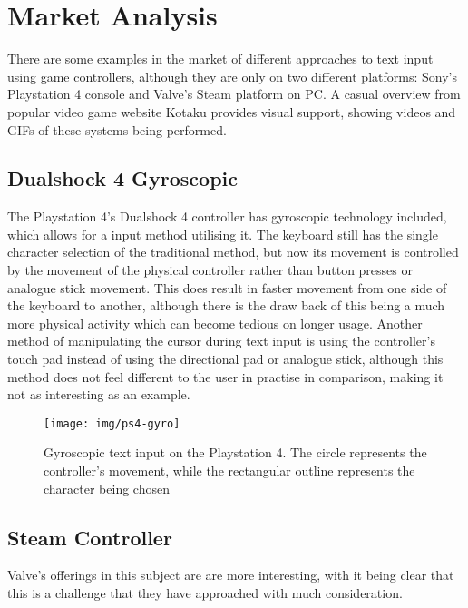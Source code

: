 \documentclass[requirements.tex]{subfiles}
\begin{document}
\section{Market Analysis} %
\label{sec:market_analysis}

There are some examples in the market of different approaches to text input
using game controllers, although they are only on two different platforms:
Sony's Playstation 4 console and Valve's Steam platform on PC. A casual overview
from popular video game website Kotaku \cite{Kotaku} provides visual support,
showing videos and GIFs of these systems being performed.

\subsection{Dualshock 4 Gyroscopic} %
\label{sub:dualshock_4_gyroscopic}
The Playstation 4's Dualshock 4 controller has gyroscopic technology included,
which allows for a input method utilising it. The keyboard still has the single
character selection of the traditional method, but now its movement is
controlled by the movement of the physical controller rather than button presses
or analogue stick movement. This does result in faster movement from one side of
the keyboard to another, although there is the draw back of this being a much
more physical activity which can become tedious on longer usage. Another method
of manipulating the cursor during text input is using the controller's touch pad
instead of using the directional pad or analogue stick, although this method
does not feel different to the user in practise in comparison, making it not as
interesting as an example.

\begin{figure}[H]
	\centering
	\texttt{[image: img/ps4-gyro]}
	\caption{Gyroscopic text input on the Playstation 4. The circle represents
	the controller's movement, while the rectangular outline represents the
	character being chosen}
\end{figure}

\subsection{Steam Controller} %
\label{sub:steam_controller}
Valve's offerings in this subject are are more interesting, with it being clear
that this is a challenge that they have approached with much consideration.
\end{document}

